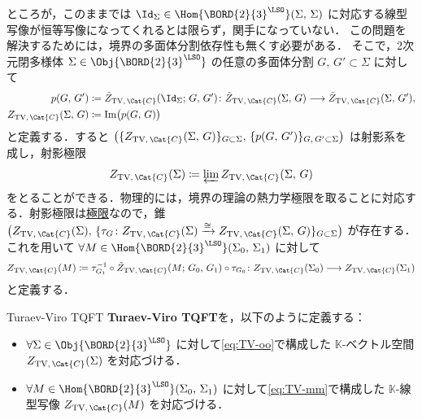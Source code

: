 \documentclass[TQFT_main]{subfiles}
\begin{document}
ところが，このままでは $\Id_\Sigma \in \Hom{\BORD{2}{3}^{\LSO}} (\Sigma,\, \Sigma)$ に対応する線型写像が恒等写像になってくれるとは限らず，関手になっていない．
この問題を解決するためには，境界の多面体分割依存性も無くす必要がある．
そこで，2次元閉多様体 $\Sigma \in \Obj{\BORD{2}{3}^{\LSO}}$ の任意の多面体分割 $G,\, G' \subset \Sigma$ に対して
\begin{align}
    p(G,\, G') &\coloneqq \tilde{Z}_{\text{TV},\, \Cat{C}} (\Id_{\Sigma};\, G,\, G') \colon \tilde{Z}_{\text{TV},\, \Cat{C}} (\Sigma,\, G) \lto \tilde{Z}_{\text{TV},\, \Cat{C}} (\Sigma,\, G'), \\
    Z_{\text{TV},\, \Cat{C}} (\Sigma,\, G) &\coloneqq \Im \bigl( p(G,\, G) \bigr)
\end{align}
と定義する．すると $\bigl( \{Z_{\text{TV},\, \Cat{C}}(\Sigma,\, G)\}_{G \subset \Sigma},\, \{p(G,\, G')\}_{G,\, G' \subset \Sigma} \bigr)$ は射影系を成し，射影極限
\begin{align}
    \label{eq:TV-oo}
    Z_{\text{TV},\, \Cat{C}} (\Sigma) \coloneqq \varprojlim Z_{\text{TV},\, \Cat{C}}(\Sigma,\, G)
\end{align}
をとることができる．物理的には，境界の理論の熱力学極限を取ることに対応する．射影極限は\hyperref[def:lim]{極限}なので，錐 $\bigl(Z_{\text{TV},\, \Cat{C}} (\Sigma),\, \{\tau_G \colon Z_{\text{TV},\, \Cat{C}} (\Sigma) \xrightarrow{\cong} Z_{\text{TV},\, \Cat{C}} (\Sigma,\, G)\}_{G \subset \Sigma}\bigr)$ が存在する．
これを用いて $\forall M \in \Hom{\BORD{2}{3}^{\LSO}} (\Sigma_0,\, \Sigma_1)$ に対して
\begin{align}
    \label{eq:TV-mm}
    Z_{\text{TV},\, \Cat{C}} (M) \coloneqq \tau_{G_1}^{-1} \circ \tilde{Z}_{\text{TV},\, \Cat{C}} (M;\, G_0,\, G_1) \circ \tau_{G_0} \colon Z_{\text{TV},\, \Cat{C}} (\Sigma_0) \lto Z_{\text{TV},\, \Cat{C}} (\Sigma_1)
\end{align}
と定義する．

\begin{mydef}[label=def:TV-TQFT]{Turaev-Viro TQFT}
    \textbf{Turaev-Viro TQFT}を，以下のように定義する：
    \begin{itemize}
        \item $\forall \Sigma \in \Obj{\BORD{2}{3}^{\LSO}}$ に対して\eqref{eq:TV-oo}で構成した $\mathbb{K}$-ベクトル空間 $Z_{\text{TV},\, \Cat{C}}(\Sigma)$ を対応づける．
        \item $\forall M \in \Hom{\BORD{2}{3}^{\LSO}}(\Sigma_0,\, \Sigma_1)$ に対して\eqref{eq:TV-mm}で構成した $\mathbb{K}$-線型写像 $Z_{\text{TV},\, \Cat{C}}(M)$ を対応づける．
    \end{itemize}
    
\end{mydef}
\end{document}

